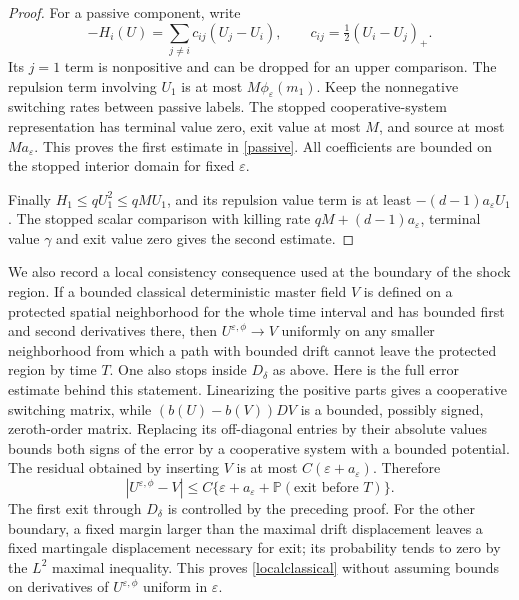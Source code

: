 \documentclass[11pt]{article}
\begin{document}
\begin{proof}
For a passive component, write
\[
 -H_i(U)=\sum_{j\ne i}c_{ij}(U_j-U_i),\qquad c_{ij}=\tfrac12(U_i-U_j)_+.
\]
Its $j=1$ term is nonpositive and can be dropped for an upper comparison. The repulsion term involving $U_1$ is at most $M\phi_\varepsilon(m_1)$. Keep the nonnegative switching rates between passive labels. The stopped cooperative-system representation has terminal value zero, exit value at most $M$, and source at most $Ma_\varepsilon$. This proves the first estimate in \eqref{passive}. All coefficients are bounded on the stopped interior domain for fixed $\varepsilon$.

Finally $H_1\le qU_1^2\le qMU_1$, and its repulsion value term is at least $-(d-1)a_\varepsilon U_1$. The stopped scalar comparison with killing rate $qM+(d-1)a_\varepsilon$, terminal value $\gamma$ and exit value zero gives the second estimate.
\end{proof}

We also record a local consistency consequence used at the boundary of the shock region. If a bounded classical deterministic master field $V$ is defined on a protected spatial neighborhood for the whole time interval and has bounded first and second derivatives there, then $U^{\varepsilon,\phi}\to V$ uniformly on any smaller neighborhood from which a path with bounded drift cannot leave the protected region by time $T$. One also stops inside $D_\delta$ as above. Here is the full error estimate behind this statement. Linearizing the positive parts gives a cooperative switching matrix, while $(b(U)-b(V))DV$ is a bounded, possibly signed, zeroth-order matrix. Replacing its off-diagonal entries by their absolute values bounds both signs of the error by a cooperative system with a bounded potential. The residual obtained by inserting $V$ is at most $C(\varepsilon+a_\varepsilon)$. Therefore
\begin{equation}\label{localclassical}
 |U^{\varepsilon,\phi}-V|\le C\{\varepsilon+a_\varepsilon+\mathbb P(\text{exit before }T)\}.
\end{equation}
The first exit through $D_\delta$ is controlled by the preceding proof. For the other boundary, a fixed margin larger than the maximal drift displacement leaves a fixed martingale displacement necessary for exit; its probability tends to zero by the $L^2$ maximal inequality. This proves \eqref{localclassical} without assuming bounds on derivatives of $U^{\varepsilon,\phi}$ uniform in $\varepsilon$.
\end{document}
